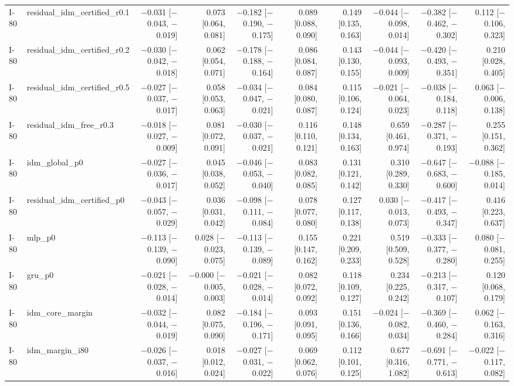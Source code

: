 \begin{table}[htbp]
{\begin{tabular}{llrrrrrrrr}
I-80 & residual\_idm\_certified\_r0.1 & $-$0.031 [$-$0.043, $-$0.019] & 0.073 [0.064, 0.081] & $-$0.182 [$-$0.190, $-$0.175] & 0.089 [0.088, 0.090] & 0.149 [0.135, 0.163] & $-$0.044 [$-$0.098, 0.014] & $-$0.382 [$-$0.462, $-$0.302] & 0.112 [$-$0.106, 0.323] \\
I-80 & residual\_idm\_certified\_r0.2 & $-$0.030 [$-$0.042, $-$0.018] & 0.062 [0.054, 0.071] & $-$0.178 [$-$0.188, $-$0.164] & 0.086 [0.084, 0.087] & 0.143 [0.130, 0.155] & $-$0.044 [$-$0.093, 0.009] & $-$0.420 [$-$0.493, $-$0.351] & 0.210 [0.028, 0.405] \\
I-80 & residual\_idm\_certified\_r0.5 & $-$0.027 [$-$0.037, $-$0.017] & 0.058 [0.053, 0.063] & $-$0.034 [$-$0.047, $-$0.021] & 0.084 [0.080, 0.087] & 0.115 [0.106, 0.124] & $-$0.021 [$-$0.064, 0.023] & $-$0.038 [$-$0.184, 0.118] & 0.063 [$-$0.006, 0.138] \\
I-80 & residual\_idm\_free\_r0.3 & $-$0.018 [$-$0.027, $-$0.009] & 0.081 [0.072, 0.091] & $-$0.030 [$-$0.037, $-$0.021] & 0.116 [0.110, 0.121] & 0.148 [0.134, 0.163] & 0.659 [0.461, 0.974] & $-$0.287 [$-$0.371, $-$0.193] & 0.255 [0.151, 0.362] \\
I-80 & idm\_global\_p0 & $-$0.027 [$-$0.036, $-$0.017] & 0.045 [0.038, 0.052] & $-$0.046 [$-$0.053, $-$0.040] & 0.083 [0.082, 0.085] & 0.131 [0.121, 0.142] & 0.310 [0.289, 0.330] & $-$0.647 [$-$0.683, $-$0.600] & $-$0.088 [$-$0.185, 0.014] \\
I-80 & residual\_idm\_certified\_p0 & $-$0.043 [$-$0.057, $-$0.029] & 0.036 [0.031, 0.042] & $-$0.098 [$-$0.111, $-$0.084] & 0.078 [0.077, 0.080] & 0.127 [0.117, 0.138] & 0.030 [$-$0.013, 0.073] & $-$0.417 [$-$0.493, $-$0.347] & 0.416 [0.223, 0.637] \\
I-80 & mlp\_p0 & $-$0.113 [$-$0.139, $-$0.090] & 0.028 [$-$0.023, 0.075] & $-$0.113 [$-$0.139, $-$0.089] & 0.155 [0.147, 0.162] & 0.221 [0.209, 0.233] & 0.519 [0.509, 0.528] & $-$0.333 [$-$0.377, $-$0.280] & 0.080 [$-$0.081, 0.255] \\
I-80 & gru\_p0 & $-$0.021 [$-$0.028, $-$0.014] & $-$0.000 [$-$0.005, 0.003] & $-$0.021 [$-$0.028, $-$0.014] & 0.082 [0.072, 0.092] & 0.118 [0.109, 0.127] & 0.234 [0.225, 0.242] & $-$0.213 [$-$0.317, $-$0.107] & 0.120 [0.068, 0.179] \\
I-80 & idm\_core\_margin & $-$0.032 [$-$0.044, $-$0.019] & 0.082 [0.075, 0.090] & $-$0.184 [$-$0.196, $-$0.171] & 0.093 [0.091, 0.095] & 0.151 [0.136, 0.166] & $-$0.024 [$-$0.082, 0.034] & $-$0.369 [$-$0.460, $-$0.284] & 0.062 [$-$0.163, 0.316] \\
I-80 & idm\_margin\_i80 & $-$0.026 [$-$0.037, $-$0.016] & 0.018 [0.012, 0.024] & $-$0.027 [$-$0.031, $-$0.022] & 0.069 [0.062, 0.076] & 0.112 [0.101, 0.125] & 0.677 [0.316, 1.082] & $-$0.691 [$-$0.771, $-$0.613] & $-$0.022 [$-$0.117, 0.082] \\

\end{tabular}}
\end{table}
